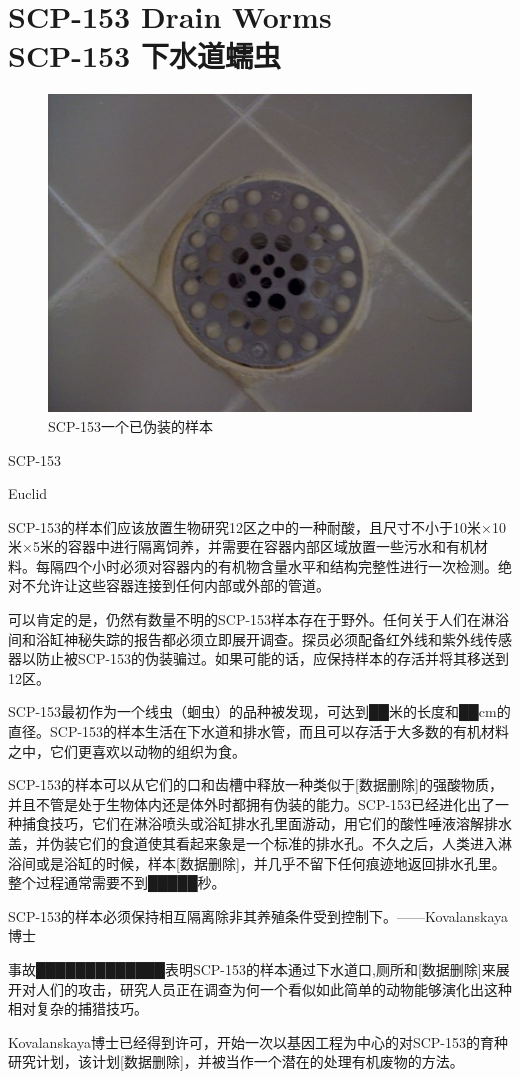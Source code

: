 \chapter[SCP-153 下水道蠕虫]{
    SCP-153 Drain Worms\\
    SCP-153 下水道蠕虫
}

\label{chap:SCP-153}

\begin{figure}[H]
    \centering
    \includegraphics[width=0.5\linewidth]{images/SCP.153.jpg}
    \caption*{SCP-153一个已伪装的样本}
\end{figure}

SCP-153

Euclid

SCP-153的样本们应该放置生物研究12区之中的一种耐酸，且尺寸不小于10米×10米×5米的容器中进行隔离饲养，并需要在容器内部区域放置一些污水和有机材料。每隔四个小时必须对容器内的有机物含量水平和结构完整性进行一次检测。绝对不允许让这些容器连接到任何内部或外部的管道。

可以肯定的是，仍然有数量不明的SCP-153样本存在于野外。任何关于人们在淋浴间和浴缸神秘失踪的报告都必须立即展开调查。探员必须配备红外线和紫外线传感器以防止被SCP-153的伪装骗过。如果可能的话，应保持样本的存活并将其移送到12区。

SCP-153最初作为一个线虫（蛔虫）的品种被发现，可达到██米的长度和██cm的直径。SCP-153的样本生活在下水道和排水管，而且可以存活于大多数的有机材料之中，它们更喜欢以动物的组织为食。

SCP-153的样本可以从它们的口和齿槽中释放一种类似于{[}数据删除]的强酸物质，并且不管是处于生物体内还是体外时都拥有伪装的能力。SCP-153已经进化出了一种捕食技巧，它们在淋浴喷头或浴缸排水孔里面游动，用它们的酸性唾液溶解排水盖，并伪装它们的食道使其看起来象是一个标准的排水孔。不久之后，人类进入淋浴间或是浴缸的时候，样本{[}数据删除]，并几乎不留下任何痕迹地返回排水孔里。整个过程通常需要不到█████秒。

SCP-153的样本必须保持相互隔离除非其养殖条件受到控制下。——Kovalanskaya博士

事故█████████████表明SCP-153的样本通过下水道口,厕所和{[}数据删除]来展开对人们的攻击，研究人员正在调查为何一个看似如此简单的动物能够演化出这种相对复杂的捕猎技巧。

Kovalanskaya博士已经得到许可，开始一次以基因工程为中心的对SCP-153的育种研究计划，该计划{[}数据删除]，并被当作一个潜在的处理有机废物的方法。
